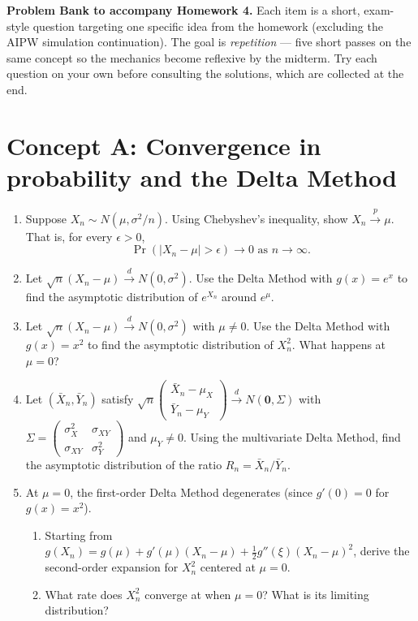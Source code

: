 \documentclass{article}
\newcommand{\pconv}{\xrightarrow{p}}
\newcommand{\dconv}{\xrightarrow{d}}
\begin{document}
\noindent\textbf{Problem Bank to accompany Homework 4.}  Each item is a short, exam-style question targeting one specific idea from the homework (excluding the AIPW simulation continuation).  The goal is \emph{repetition} --- five short passes on the same concept so the mechanics become reflexive by the midterm.  Try each question on your own before consulting the solutions, which are collected at the end.

\bigskip

\section*{Concept A: Convergence in probability and the Delta Method}

\begin{enumerate}[label=\textbf{A.\arabic*},leftmargin=*,itemsep=10pt]

\item  Suppose $X_n \sim N(\mu, \sigma^2/n)$.  Using Chebyshev's inequality, show $X_n \pconv \mu$.  That is, for every $\epsilon > 0$,
$$\Pr(|X_n - \mu| > \epsilon) \to 0 \text{ as } n \to \infty.$$

\item  Let $\sqrt{n}(X_n - \mu) \dconv N(0, \sigma^2)$.  Use the Delta Method with $g(x) = e^x$ to find the asymptotic distribution of $e^{X_n}$ around $e^\mu$.

\item  Let $\sqrt{n}(X_n - \mu) \dconv N(0, \sigma^2)$ with $\mu \neq 0$.  Use the Delta Method with $g(x) = x^2$ to find the asymptotic distribution of $X_n^2$.  What happens at $\mu = 0$?

\item  Let $(\bar X_n, \bar Y_n)$ satisfy $\sqrt{n}\!\begin{pmatrix}\bar X_n - \mu_X \\ \bar Y_n - \mu_Y\end{pmatrix} \dconv N(\bm 0, \Sigma)$ with $\Sigma = \begin{pmatrix}\sigma_X^2 & \sigma_{XY} \\ \sigma_{XY} & \sigma_Y^2\end{pmatrix}$ and $\mu_Y \neq 0$.  Using the multivariate Delta Method, find the asymptotic distribution of the ratio $R_n = \bar X_n / \bar Y_n$.

\item  At $\mu = 0$, the first-order Delta Method degenerates (since $g'(0) = 0$ for $g(x) = x^2$).
\begin{enumerate}[label=(\alph*)]
  \item Starting from $g(X_n) = g(\mu) + g'(\mu)(X_n - \mu) + \tfrac{1}{2}g''(\xi)(X_n - \mu)^2$, derive the second-order expansion for $X_n^2$ centered at $\mu = 0$.
  \item What rate does $X_n^2$ converge at when $\mu = 0$?  What is its limiting distribution?
\end{enumerate}

\end{enumerate}
\end{document}
